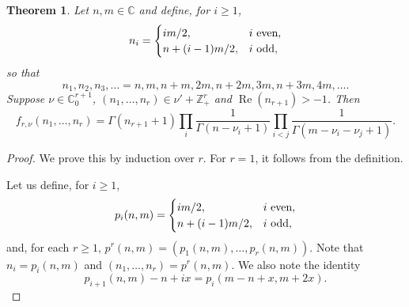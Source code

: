 \documentclass[pdftex]{sigma}
\newtheorem{thm}{Theorem}[section]
\theoremstyle{definition}
\newcommand{\C}{{\mathbb C}}
\newcommand\Z{{\mathbb Z}}
\begin{document}
\begin{thm}\label{ff} Let $n,m\in\C$ and define, for $i\ge 1$,
\[ n_i=\begin{cases}
 im/2 ,& i \mbox{ \rm even},\\ n+(i-1)m/2, & i \mbox{ \rm odd},\end{cases}\]
so that
\begin{equation}\label{n1n2} n_1,n_2,n_3,\ldots =n,m,n+m,2m,n+2m,3m,n+3m,4m,\ldots . \end{equation}
Suppose $\nu\in\C_0^{r+1}$, $(n_1,\dots,n_r)\in \nu'+\Z_+^{r}$ and $\operatorname{Re}(n_{r+1})>-1$. Then
\[f_{r,\nu}(n_1,\dots,n_r) = \Gamma(n_{r+1}+1) \prod_i \frac1{\Gamma(n-\nu_i+1) }\prod_{i<j} \frac1{\Gamma(m-\nu_i-\nu_j+1)}.\]
\end{thm}
\begin{proof}
We prove this by induction over $r$. For $r=1$, it follows from the definition.

Let us define, for $i\ge 1$,
\[ p_i(n,m)=\begin{cases} im/2 ,& i \mbox{ \rm even},\\ n+(i-1)m/2 ,& i \mbox{ \rm odd},\end{cases}\]
and, for each $r\ge 1$,
$p^r(n,m)=(p_1(n,m),\dots,p_r(n,m))$.
Note that $n_i=p_i(n,m)$ and $(n_1,\dots,\allowbreak n_r)=p^r(n,m)$.
We also note the identity
\begin{equation}\label{pki}
p_{i+1}(n,m)-n+ix=p_i(m-n+x,m+2x).
\end{equation}


\end{proof}
\end{document}
